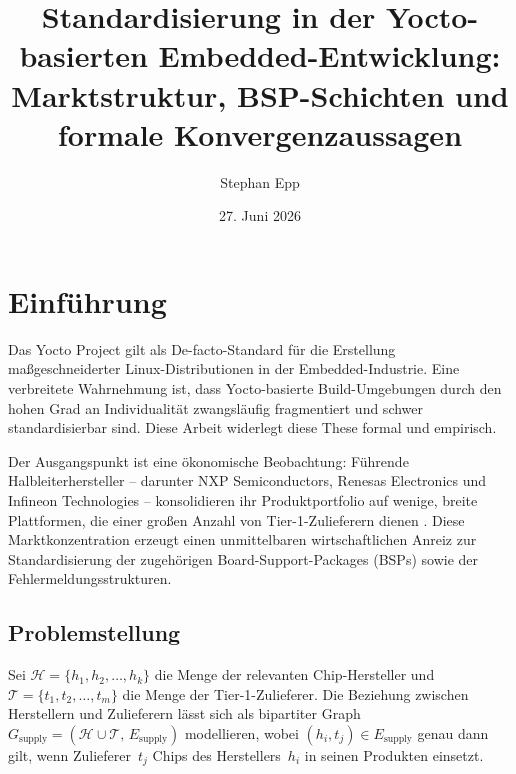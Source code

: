 ﻿\documentclass[a4paper,12pt]{article}
\title{Standardisierung in der Yocto-basierten Embedded-Entwicklung:\\
Marktstruktur, BSP-Schichten und formale Konvergenzaussagen}
\author{Stephan Epp}
\date{27. Juni 2026}
\theoremstyle{definition}
\begin{document}
\sloppy

\maketitle

\tableofcontents
\newpage

\section{Einführung}

Das Yocto Project \cite{yocto2024} gilt als De-facto-Standard für die Erstellung maßgeschneiderter
Linux-Distributionen in der Embedded-Industrie. Eine verbreitete Wahrnehmung ist,
dass Yocto-basierte Build-Umgebungen durch den hohen Grad an Individualität zwangsläufig
fragmentiert und schwer standardisierbar sind. Diese Arbeit widerlegt diese These formal und empirisch.

Der Ausgangspunkt ist eine ökonomische Beobachtung: Führende Halbleiterhersteller --
darunter NXP Semiconductors, Renesas Electronics und Infineon Technologies -- konsolidieren
ihr Produktportfolio auf wenige, breite Plattformen, die einer großen Anzahl von
Tier-1-Zulieferern dienen \cite{nxp2023, renesas2023, infineon2023}. Diese Marktkonzentration
erzeugt einen unmittelbaren wirtschaftlichen Anreiz zur Standardisierung der zugehörigen
Board-Support-Packages (BSPs) sowie der Fehlermeldungsstrukturen.

\subsection{Problemstellung}

Sei $\mathcal{H} = \{h_1, h_2, \ldots, h_k\}$ die Menge der relevanten Chip-Hersteller
und $\mathcal{T} = \{t_1, t_2, \ldots, t_m\}$ die Menge der Tier-1-Zulieferer.
Die Beziehung zwischen Herstellern und Zulieferern lässt sich als bipartiter Graph
$G_{\mathrm{supply}} = (\mathcal{H} \cup \mathcal{T},\, E_{\mathrm{supply}})$ modellieren,
wobei $(h_i, t_j) \in E_{\mathrm{supply}}$ genau dann gilt, wenn Zulieferer~$t_j$
Chips des Herstellers~$h_i$ in seinen Produkten einsetzt.
\end{document}
